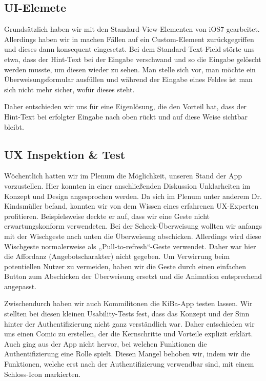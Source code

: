 \subsection{UI-Elemete}
	Grundsätzlich haben wir mit den Standard-View-Elementen von iOS7 gearbeitet. Allerdings haben wir in machen Fällen auf ein Custom-Element zurückgegriffen und dieses dann konsequent eingesetzt. Bei dem Standard-Text-Field störte uns etwa, dass der Hint-Text bei der Eingabe verschwand und so die Eingabe gelöscht werden musste, um diesen wieder zu sehen. Man stelle sich vor, man möchte ein Überweisungsformular ausfüllen und während der Eingabe eines Feldes ist man sich nicht mehr sicher, wofür dieses steht. 

	Daher entschieden wir uns für eine Eigenlösung, die den Vorteil hat, dass der Hint-Text bei erfolgter Eingabe nach oben rückt und auf diese Weise sichtbar bleibt. 

\subsection{UX Inspektion \& Test}
	Wöchentlich hatten wir im Plenum die Möglichkeit, unseren Stand der App vorzustellen. Hier konnten in einer anschließenden Diskussion Unklarheiten im Konzept und Design angesprochen werden. Da sich im Plenum unter anderem Dr. Kindsmüller befand, konnten wir von dem Wissen eines erfahrenen UX-Experten profitieren. Beispielsweise deckte er auf, dass wir eine Geste nicht erwartungskonform verwendeten. Bei der Scheck-Überweisung wollten wir anfangs mit der Wischgeste nach unten die Überweisung abschicken. Allerdings wird diese Wischgeste normalerweise als „Pull-to-refresh“-Geste verwendet. Daher war hier die Affordanz (Angebotscharakter) nicht gegeben. Um Verwirrung beim potentiellen Nutzer zu vermeiden, haben wir die Geste durch einen einfachen Button zum Abschicken der Überweisung ersetzt und die Animation entsprechend angepasst.

	Zwischendurch haben wir auch Kommilitonen die KiBa-App testen lassen. Wir stellten bei diesen kleinen Usability-Tests fest, dass das Konzept und der Sinn hinter der Authentifizierung nicht ganz verständlich war. Daher entschieden wir uns einen Comic zu erstellen, der die Kernschritte und Vorteile explizit erklärt. Auch ging aus der App nicht hervor, bei welchen Funktionen die Authentifizierung eine Rolle spielt. Diesen Mangel behoben wir, indem wir die Funktionen, welche erst nach der Authentifizierung verwendbar sind, mit einem Schloss-Icon markierten.
	

